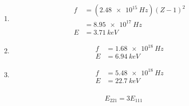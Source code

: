 \documentclass{article}
\begin{document}
\begin{enumerate}
  \item

        \begin{align*}
          f & = (\qty{2.48e15}{Hz}) (Z - 1)^2 \\
            & = \qty{8.95e17}{Hz}             \\
          E & = \qty{3.71}{keV}
        \end{align*}

  \item

        \begin{align*}
          f & = \qty{1.68e18}{Hz} \\
          E & = \qty{6.94}{keV}
        \end{align*}

  \item

        \begin{align*}
          f & = \qty{5.48e18}{Hz} \\
          E & = \qty{22.7}{keV}
        \end{align*}
\end{enumerate}

\setcounter{subsubsection}{38}
\subsubsection{}

\[E_{221} = 3 E_{111}\]

\setcounter{subsubsection}{40}
\subsubsection{}
\end{document}
